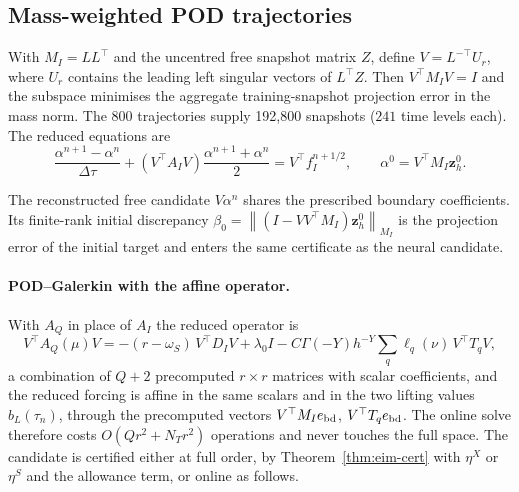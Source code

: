 \documentclass[11pt]{amsart}
\theoremstyle{remark}
\newcommand{\norm}[1]{\left\lVert #1\right\rVert}
\newcommand{\dt}{\Delta\tau}
\newcommand{\zz}{\mathbf z}
\newcommand{\rf}{r}
\begin{document}
\subsection{Mass-weighted POD trajectories}
\label{ssec:pod-construction}
With $M_I=LL^\top$ and the uncentred free snapshot matrix $Z$, define
$V=L^{-\top}U_r$, where $U_r$ contains the leading left singular vectors of
$L^\top Z$. Then $V^\top M_IV=I$ and the subspace minimises the aggregate
training-snapshot projection error in the mass norm. The 800 trajectories
supply 192,800 snapshots ($241$ time levels each). The reduced equations are
\begin{equation}
 \frac{\alpha^{n+1}-\alpha^n}{\dt}
 + (V^\top A_I V)\frac{\alpha^{n+1}+\alpha^n}{2}
 = V^\top f_I^{n+1/2},\qquad
 \alpha^0=V^\top M_I \zz_h^0.
 \label{eq:repaired-pod-cn}
\end{equation}

The reconstructed free candidate $V\alpha^n$ shares the prescribed boundary
coefficients. Its finite-rank initial discrepancy $\beta_0=\norm{(I-VV^\top M_I)\zz_h^0}_{M_I}$
is the projection error of the initial target and enters the same certificate as the neural
candidate.

\paragraph{POD--Galerkin with the affine operator.}
With $A_Q$ in place of $A_I$ the reduced operator is
\[
V^\top A_Q(\mu)V=-(\rf-\omega_S)\,V^\top D_IV+\lambda_0 I-C\Gamma(-Y)h^{-Y}\sum_q\ell_q(\nu)\,V^\top T_qV,
\]
a combination of $Q+2$ precomputed $r\times r$ matrices with scalar coefficients, and the
reduced forcing is affine in the same scalars and in the two lifting values $b_L(\tau_n)$, through
the precomputed vectors $V^\top M_I e_{\rm bd}$, $V^\top T_q e_{\rm bd}$.  The online solve therefore
costs $O(Qr^2+N_Tr^2)$ operations and never touches the full space.  The candidate is certified
either at full order, by Theorem~\ref{thm:eim-cert} with $\eta^X$ or $\eta^S$ and the allowance
term, or online as follows.
\end{document}
